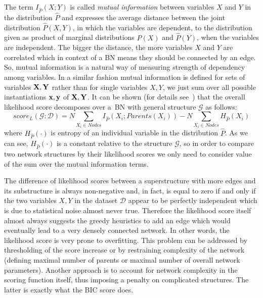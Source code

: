 \documentclass[english,cover]{fitthesis} %
\newcommand{\term}[1]{\emph{#1}}           %
\newcommand{\vars}[1]{{\bold{#1}}}         %
\begin{document}
The term $I_{\hat P}(X; Y)$ is called \term{mutual information} between variables $X$ and $Y$ in the distribution $\hat P$ and expresses the average distance between the joint distribution $\hat P(X,Y)$, in which the variables are dependent, to the distribution given as product of marginal distributions $\hat P(X)$ and $\hat P(Y)$, when the variables are independent. The bigger the distance, the more variables $X$ and $Y$ are correlated which in context of a BN means they should be connected by an edge. So, mutual information is a natural way of measuring strength of dependency among variables. In a similar fashion mutual information is defined for sets of variables $\vars{X},\vars{Y}$ rather than for single variables $X,Y$, we just sum over all possible instantiations $\vars{x},\vars{y}$ of $\vars{X},\vars{Y}$. It can be shown (for details see~\cite[p.~792]{pgm}) that the overall likelihood score decomposes over a~BN with general structure $\mathcal{G}$ as follows:
\begin{equation}
    score_L(\mathcal{G} : \mathcal{D}) = N \!\!\!\!\!\! \sum_{X_i \in Nodes} \!\!\!\!\!\! I_{\hat P}(X_i;Parents(X_i)) - N \!\!\!\!\!\! \sum_{X_i \in Nodes} \!\!\!\!\!\! H_{\hat P}(X_i)
\end{equation}
where $H_{\hat P}(\cdot)$ is entropy of an individual variable in the distribution $\hat P$. As we can see, $H_{\hat P}(\cdot)$ is a constant relative to the structure $\mathcal{G}$, so in order to compare two network structures by their likelihood scores we only need to consider value of the sum  over the mutual information terms.

\medskip
The difference of likelihood scores between a superstructure with more edges and its substructure is always non-negative and, in fact, is equal to zero if and only if the two variables $X,Y$ in the dataset $\mathcal{D}$ appear to be perfectly independent which is due to statistical noise almost never true. Therefore the likelihood score itself almost always suggests the greedy heuristics to add an edge which would eventually lead to a very densely connected network. In other words, the likelihood score is very prone to overfitting. This problem can be addressed by thresholding of the score increase or by restraining complexity of the network (defining maximal number of parents or maximal number of overall network parameters). Another approach is to account for network complexity in the scoring function itself, thus imposing a penalty on complicated structures. The latter is exactly what the BIC score does.
\end{document}
